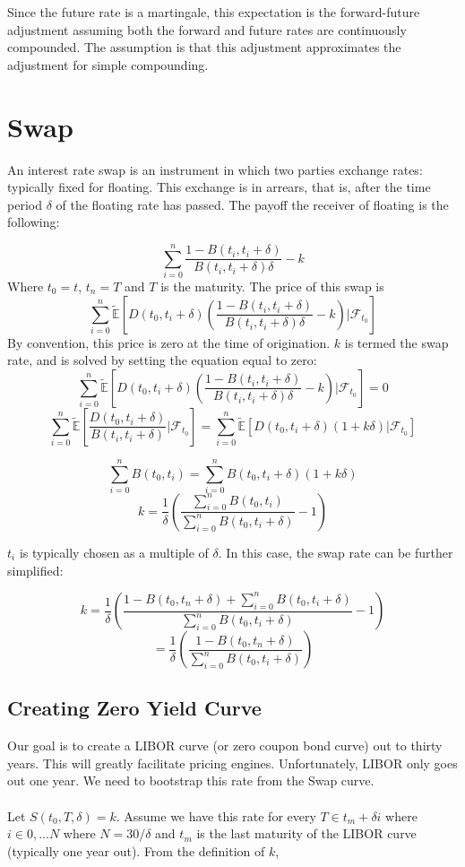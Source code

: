 \documentclass{article}
\theoremstyle{definition}
\begin{document}
Since the future rate is a martingale, this expectation is the forward-future adjustment assuming both the forward and future rates are continuously compounded. The assumption is that this adjustment approximates the adjustment for simple compounding.


\section{Swap}

An interest rate swap is an instrument in which two parties exchange rates: typically fixed for floating.  This exchange is in arrears, that is, after the time period \(\delta\) of the floating rate has passed.  The payoff the receiver of floating is the following:

\[\sum_{i=0} ^ n \frac{1-B(t_i, t_i+\delta)}{B(t_i, t_i+\delta)\delta}-k\]
Where \(t_0=t\), \(t_n=T\) and \(T\) is the maturity. The price of this swap is
\[\sum_{i=0}^n \mathbb{\tilde{E}}\left[D(t_0, t_i+\delta)\left(\frac{1-B(t_i, t_i+\delta)}{B(t_i, t_i+\delta)\delta}-k\right)|\mathcal{F}_{t_0}\right]\]
By convention, this price is zero at the time of origination.  \(k\) is termed the swap rate, and is solved by setting the equation equal to zero:
\[\sum_{i=0}^n \mathbb{\tilde{E}}\left[D(t_0, t_i+\delta)\left(\frac{1-B(t_i, t_i+\delta)}{B(t_i, t_i+\delta)\delta}-k\right)|\mathcal{F}_{t_0}\right]=0\]
\[\sum_{i=0}^n \mathbb{\tilde{E}}\left[\frac{D(t_0, t_i+\delta)}{B(t_i, t_i+\delta)}|\mathcal{F}_{t_0}\right]=\sum_{i=0}^n \mathbb{\tilde{E}}\left[D(t_0, t_i+\delta)\left(1+k\delta\right)|\mathcal{F}_{t_0}\right]\]

\[\sum_{i=0}^n B(t_0, t_i)=\sum_{i=0}^n B(t_0, t_i+\delta)\left(1+k\delta\right)\]
\[k=\frac{1}{\delta}\left(\frac{\sum_{i=0}^n B(t_0, t_i)}{\sum_{i=0}^n B(t_0, t_i+\delta)}-1\right)\]

\(t_i\) is typically chosen as a multiple of \(\delta\).  In this case, the swap rate can be further simplified:

\[k=\frac{1}{\delta}\left(\frac{1-B(t_0, t_n+\delta)+\sum_{i=0}^n B(t_0, t_i+\delta)}{\sum_{i=0}^n B(t_0, t_i+\delta)}-1\right)\]
\[=\frac{1}{\delta}\left(\frac{1-B(t_0, t_n+\delta)}{\sum_{i=0}^n B(t_0, t_i+\delta)}\right)\]

\subsection{Creating Zero Yield Curve}

Our goal is to create a LIBOR curve (or zero coupon bond curve) out to thirty years.  This will greatly facilitate pricing engines. Unfortunately, LIBOR only goes out one year.  We need to bootstrap this rate from the Swap curve.
\\
\\
Let \(S(t_0, T, \delta)=k\).  Assume we have this rate for every \(T \in t_m+\delta i\) where \(i\in 0,...N\) where \(N=30/ \delta\) and \(t_m\) is the last maturity of the LIBOR curve (typically one year out).  From the definition of \(k\), 
\end{document}
